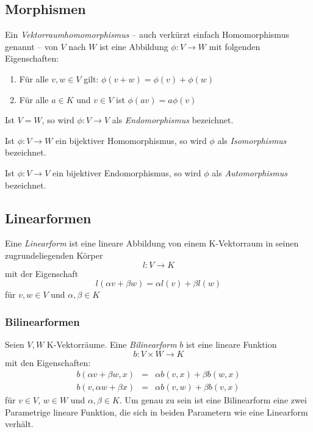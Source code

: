 \subsection{Morphismen}

\begin{definition}

Ein \emph{Vektorraumhomomorphismus} -- auch verkürzt einfach Homomorphismus genannt -- von $V$ nach $W$ ist eine Abbildung $\phi : V \longrightarrow W$ mit folgenden Eigenschaften:
\begin{enumerate}
\item Für alle $v,w \in V$ gilt: $\phi(v+w) = \phi(v)+\phi(w)$
\item Für alle $a\in K$ und $v\in V$ ist $\phi(av)=a\phi(v)$
\end{enumerate}
Ist $V=W$, so wird $\phi : V\longrightarrow V$ als \emph{Endomorphismus} bezeichnet.
\end{definition}

\begin{definition}
Ist $\phi : V\longrightarrow W$ ein bijektiver Homomorphismus, so wird $\phi$ als \emph{Isomorphismus} bezeichnet.
\end{definition}

\begin{definition}
Ist $\phi : V\longrightarrow V$ ein bijektiver Endomorphismus,  so wird $\phi$ als \emph{Automorphismus} bezeichnet.
\end{definition}

\subsection{Linearformen}

\begin{definition}
Eine \emph{Linearform}  ist eine lineare Abbildung von einem K-Vektorraum in seinen zugrundeliegenden Körper
\[
l : V \longrightarrow K
\]
mit der Eigenschaft
\[l(\alpha v + \beta w) = \alpha l(v) + \beta l(w) \]
für $v,w\in V$ und $\alpha, \beta \in K$
\end{definition}

\subsubsection{Bilinearformen}

\begin{definition}
Seien $V,W$ K-Vektorräume. Eine \emph{Bilinearform} $b$ ist eine lineare Funktion
\[
	b : V \times W \longrightarrow K
\]
mit den Eigenschaften:
\begin{eqnarray*}
b(\alpha v + \beta w,x) &=& \alpha b(v,x) + \beta b(w,x) \\
b(v,\alpha w + \beta x) &=& \alpha b(v,w) + \beta b(v,x) 
\end{eqnarray*}
für $v\in V$, $w\in W$ und $\alpha, \beta \in K$. Um genau zu sein ist eine Bilinearform eine zwei Parametrige lineare Funktion, die sich in beiden Parametern wie eine Linearform verhält.
\end{definition}

